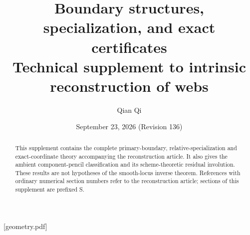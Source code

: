 
[geometry.pdf]
\renewcommand{\thesection}{S\arabic{section}}

\title[Boundary structures and exact certificates]{Boundary structures, specialization, and exact certificates\\Technical supplement to intrinsic reconstruction of webs}
\author{Qian Qi}
\date{September 23, 2026 (Revision 136)}
\begin{abstract}This supplement contains the complete primary-boundary,
relative-specialization and exact-coordinate theory accompanying the
reconstruction article.  It also gives the ambient component-pencil
classification and its scheme-theoretic residual involution.
These results are not hypotheses of the smooth-locus inverse theorem.
References with ordinary numerical section numbers refer to the
reconstruction article; sections of this supplement are prefixed S.
\end{abstract}
\maketitle
\enlargethispage{3pt}
\tableofcontents


















